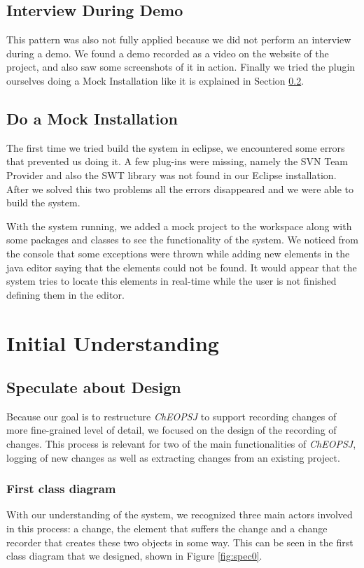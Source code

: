 \documentclass{article}
\begin{document}
\subsection{Interview During Demo}
This pattern was also not fully applied because we did not perform an interview during a demo. We found a demo recorded as a video on the website of the project, and also saw some screenshots of it in action. Finally we tried the plugin ourselves doing a Mock Installation like it is explained in Section \ref{sec:mock}.

\subsection{Do a Mock Installation}
\label{sec:mock}
The first time we tried build the system in eclipse, we encountered some errors that prevented us doing it. A few plug-ins were missing, namely the SVN Team Provider and also the SWT library was not found in our Eclipse installation. After we solved this two problems all the errors disappeared and we were able to build the system. 

With the system running, we added a mock project to the workspace along with some packages and classes to see the functionality of the system. We noticed from the console that some exceptions were thrown while adding new elements in the java editor saying that the elements could not be found. It would appear that the system tries to locate this elements in real-time while the user is not finished defining them in the editor.

\section{Initial Understanding}

\subsection{Speculate about Design}
Because our goal is to restructure \emph{ChEOPSJ} to support recording changes of more fine-grained level of detail, we focused on the design of the recording of changes. This process is relevant for two of the main functionalities of \emph{ChEOPSJ}, logging of new changes as well as extracting changes from an existing project.

\subsubsection{First class diagram}
With our understanding of the system, we recognized three main actors involved in this process: a change, the element that suffers the change and a change recorder that creates these two objects in some way. This can be seen in the first class diagram that we designed, shown in Figure \ref{fig:spec0}.
\end{document}
